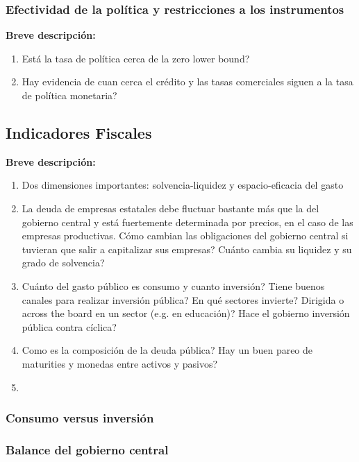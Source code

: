 \documentclass[12pt,a4paper]{article}
\begin{document}
\subsubsection{Efectividad de la política y restricciones a los instrumentos}
\textbf{Breve descripción:} \newline

\begin{enumerate}
	\item Está la tasa de política cerca de la zero lower bound?
	\item Hay evidencia de cuan cerca el crédito y las tasas comerciales siguen a la tasa de política monetaria?	
\end{enumerate}



\vspace{0.5cm}
\subsection{Indicadores Fiscales}
\textbf{Breve descripción:} \newline

\begin{enumerate}
	\item Dos dimensiones importantes: solvencia-liquidez y espacio-eficacia del gasto
	\item La deuda de empresas estatales debe fluctuar bastante más que la del gobierno central y está fuertemente determinada por precios, en el caso de las empresas productivas. Cómo cambian las obligaciones del gobierno central si tuvieran que salir a capitalizar sus empresas? Cuánto cambia su liquidez y su grado de solvencia?
	\item Cuánto del gasto público es consumo y cuanto inversión? Tiene buenos canales para realizar inversión pública? En qué sectores invierte? Dirigida o across the board en un sector (e.g. en educación)? Hace el gobierno inversión pública contra cíclica?
	\item Como es la composición de la deuda pública? Hay un buen pareo de maturities y monedas entre activos y pasivos? 
	\item 
\end{enumerate}

\subsubsection{Consumo versus inversión}

\subsubsection{Balance del gobierno central}
\end{document}
